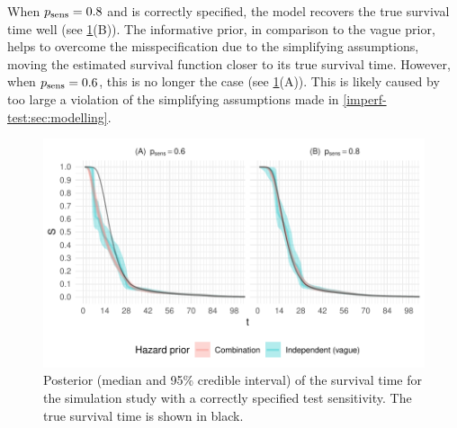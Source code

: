 \documentclass[thesis.tex]{subfiles}
\begin{document}
When $p_\text{sens} = 0.8$ and is correctly specified, the model recovers the true survival time well (see \cref{imperf-test:fig:constant-test-sensitivity}(B)).
The informative prior, in comparison to the vague prior, helps to overcome the misspecification due to the simplifying assumptions, moving the estimated survival function closer to its true survival time.
However, when $p_\text{sens} = 0.6$, this is no longer the case (see \cref{imperf-test:fig:constant-test-sensitivity}(A)).
This is likely caused by too large a violation of the simplifying assumptions made in \cref{imperf-test:sec:modelling}.
\begin{figure}
  \includegraphics[width=\textwidth]{cis-imperfect-testing/sim-constant-sensitivity}
  \caption[Simulation study results with constant test sensitivity]{%
    Posterior (median and 95\% credible interval) of the survival time for the simulation study with a correctly specified test sensitivity.
    The true survival time is shown in black.
  }
  \label{imperf-test:fig:constant-test-sensitivity}
\end{figure}
\end{document}
